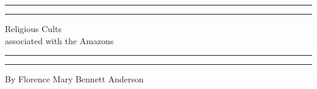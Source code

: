 \documentclass[a4paper, 12pt, oneside]{article}
\begin{document}
\renewcommand{\thefigure}{\Fontauri{\arabic{figure}}}
\renewcommand\thefootnote{\Fontauri{\arabic{footnote}}}
\let\oldfootnote\footnote
    \renewcommand{\footnote}[1]{\oldfootnote{\Fontauri#1}}
\begin{titlepage} %
	\centering %
	\scshape %

	
	\rule{\textwidth}{1.6pt}\vspace*{-\baselineskip}\vspace*{2pt} %
	\rule{\textwidth}{0.4pt} %
	
	\vspace{0.75\baselineskip} %

        {\Huge Religious Cults \\associated with the Amazons} %
	
	\vspace{0.75\baselineskip} %
	
	\rule{\textwidth}{0.4pt}\vspace*{-\baselineskip}\vspace{3.2pt} %
	\rule{\textwidth}{1.6pt} %
	
	\vspace{1\baselineskip} %
	
	
	{\Large By Florence Mary Bennett Anderson} %
	
	\vspace*{1\baselineskip} %
	
	
	\vspace{1\baselineskip} %

	
	

\end{titlepage}
\end{document}
